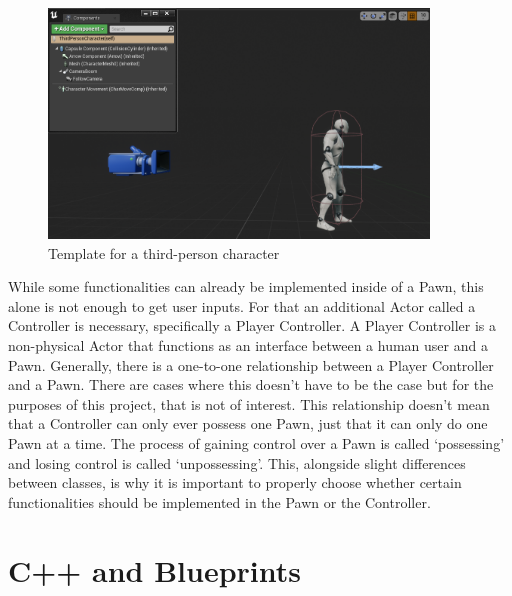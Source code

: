\begin{figure}[htpb]
	\centering
	\includegraphics[width=0.9\textwidth]{fig/UnrealCharacter.png}
	\caption[Template for third person character]{Template for a third-person character\protect}
	\label{fig:UnrealCharacter}
\end{figure}

While some functionalities can already be implemented inside of a Pawn, this alone is not enough to get user inputs. For that an additional Actor called a Controller is necessary, specifically a Player Controller. A Player Controller is a non-physical Actor that functions as an interface between a human user and a Pawn\cite{bib:UEControllers}. Generally, there is a one-to-one relationship between a Player Controller and a Pawn. There are cases where this doesn't have to be the case but for the purposes of this project, that is not of interest. This relationship doesn't mean that a Controller can only ever possess one Pawn, just that it can only do one Pawn at a time. The process of gaining control over a Pawn is called `possessing' and losing control is called `unpossessing'. This, alongside slight differences between classes, is why it is important to properly choose whether certain functionalities should be implemented in the Pawn or the Controller.

\section{C++ and Blueprints}

